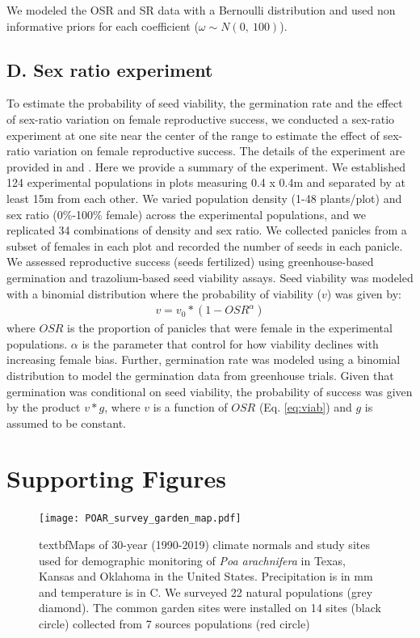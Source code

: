 \documentclass[9pt,twoside,lineno]{pnas-new}
\begin{document}
We modeled the OSR and SR data with a Bernoulli distribution and used non informative priors for each coefficient ($\omega \sim N(0,\ 100)$). 

\subsection*{D. Sex ratio experiment} 
To estimate the probability of seed viability,  the germination rate and the effect of sex-ratio variation on female reproductive success, we conducted a sex-ratio experiment at one site near the center of the range to estimate the effect of sex-ratio variation on female reproductive success.
The details of the experiment are provided in \cite{compagnoni2017can} and \cite{miller2022two}.
Here we provide a summary of the experiment.
We established 124 experimental populations in plots measuring 0.4 x 0.4m and separated by at least 15m from each other.
We varied population density (1-48 plants/plot) and sex ratio (0\%-100\% female) across the experimental populations, and we replicated 34 combinations of density and sex ratio.
We collected panicles from a subset of females in each plot and recorded the number of seeds in each panicle.
We assessed reproductive success (seeds fertilized) using greenhouse-based germination and trazolium-based seed viability assays.
Seed viability was modeled with a binomial distribution where the probability of viability ($v$) was given by:
\begin{align}\label{eq:viab}
	v = v_{0} * (1 - OSR^{\alpha})
\end{align}
\noindent where $OSR$ is the proportion of panicles that were female in the experimental populations.
$\alpha$ is the parameter that control for how viability declines with increasing female bias.
Further, germination rate was modeled using a binomial distribution to model the germination data from greenhouse trials.
Given that germination was conditional on seed viability, the probability of success was given by the product $v*g$, where $v$ is a function of $OSR$ (Eq. \ref{eq:viab}) and $g$ is assumed to be constant.

\clearpage
\section*{Supporting Figures}
\begin{figure}[H]
\centering
\texttt{[image: POAR\_survey\_garden\_map.pdf]}
\caption{textbf{Maps of 30-year (1990-2019) climate normals and study sites used for demographic monitoring of \emph{Poa arachnifera} in Texas, Kansas and Oklahoma in the United States}.
 Precipitation is in mm and temperature is in \degree  C.
 We surveyed 22 natural populations (grey diamond).
 The common garden sites were installed on 14 sites (black circle) collected from 7 sources populations (red circle)}
 \label{Sup:long_lat_garden}
\end{figure}
\clearpage
\end{document}
